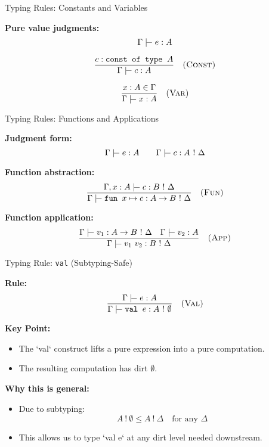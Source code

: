 \begin{frame}{Typing Rules: Constants and Variables}

\textbf{Pure value judgments:}
\[
\Gamma \tvdash e : A
\]

\vspace{1em}

\[
\frac{c : \texttt{const of type } A}
{\Gamma \tvdash c : A}
\quad\textsc{(Const)}
\]

\vspace{1em}

\[
\frac{x : A \in \Gamma}
{\Gamma \tvdash x : A}
\quad\textsc{(Var)}
\]

\end{frame}

\begin{frame}{Typing Rules: Functions and Applications}

\textbf{Judgment form:}
\[
\Gamma \tvdash e : A
\qquad
\Gamma \tvdash c : A\ !\ \Delta
\]

\vspace{1em}

\textbf{Function abstraction:}
\[
\frac{\Gamma, x : A \tvdash c : B\ !\ \Delta}
{\Gamma \tvdash \texttt{fun } x \mapsto c : A \rightarrow B\ !\ \Delta}
\quad\textsc{(Fun)}
\]

\vspace{1.5em}

\textbf{Function application:}
\[
\frac{
  \Gamma \tvdash v_1 : A \rightarrow B\ !\ \Delta
  \quad
  \Gamma \tvdash v_2 : A
}{
  \Gamma \tvdash v_1\ v_2 : B\ !\ \Delta
}
\quad\textsc{(App)}
\]

\end{frame}

\begin{frame}{Typing Rule: \texttt{val} (Subtyping-Safe)}

\textbf{Rule:}
\[
\frac{\Gamma \tvdash e : A}
{\Gamma \tvdash \texttt{val } e : A\ !\ \emptyset}
\quad\textsc{(Val)}
\]

\vspace{1em}
\textbf{Key Point:}
\begin{itemize}
  \item The `val` construct lifts a pure expression into a pure computation.
  \item The resulting computation has dirt \( \emptyset \).
\end{itemize}

\vspace{1em}
\textbf{Why this is general:}
\begin{itemize}
  \item Due to subtyping:
  \[
  A\ !\ \emptyset \leq A\ !\ \Delta \quad \text{for any } \Delta
  \]
  \item This allows us to type `val e` at any dirt level needed downstream.
\end{itemize}

\end{frame}

